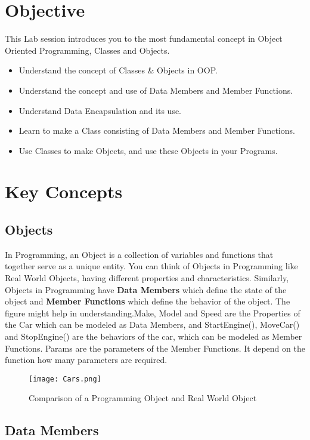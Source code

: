 \documentclass[11pt,fleqn]{book} %
\begin{document}
\section{Objective}

This Lab session introduces you to the most fundamental concept in Object Oriented Programming, Classes and Objects.

\begin{itemize}
\item Understand the concept of Classes \& Objects in OOP.
\item Understand the concept and use of Data Members and Member Functions.
\item Understand Data Encapsulation and its use.
\item Learn to make a Class consisting of Data Members and Member Functions.
\item Use Classes to make Objects, and use these Objects in your Programs.
\end{itemize}
\section{Key Concepts}

\subsection{Objects}

In Programming, an Object is a collection of variables and functions that together serve as a unique entity. You can think of Objects in Programming like Real World Objects, having different properties and characteristics. Similarly, Objects in Programming have \textbf{Data Members} which define the state of the object and \textbf{Member Functions} which define the behavior of the object. The figure might help in understanding.Make, Model and Speed are the Properties of the Car which can be modeled as Data Members, and StartEngine(), MoveCar() and StopEngine() are the behaviors of the car, which can be modeled as Member Functions. Params are the parameters of the Member Functions. It depend on the function how many parameters are required. 

\begin{figure}[H]
  \centering
  \texttt{[image: Cars.png]}
  \caption{Comparison of a Programming Object and Real World Object}
  \label{fig:my_label}
\end{figure}

\subsection{Data Members}
\end{document}
